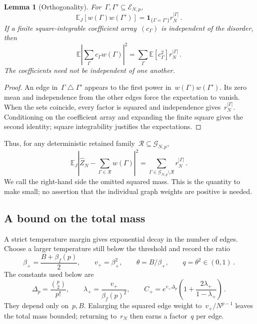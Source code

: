 \documentclass[10pt]{article}
\theoremstyle{plain}
\newtheorem{lemma}[theorem]{Lemma}
\theoremstyle{definition}
\theoremstyle{remark}
\begin{document}
\begin{lemma}[Orthogonality]\label{lem:orthogonality}
For~$\Gamma,\Gamma'\subseteq\mathcal E_{N,p}$,
\begin{equation}\label{eq:orthogonality}
 \mathbb E_J[w(\Gamma)w(\Gamma')]=\mathbf1_{\{\Gamma=\Gamma'\}}r_N^{|\Gamma|}\,.
\end{equation}
If a finite square-integrable coefficient array~$(c_\Gamma)$ is independent of the disorder, then
\begin{equation}\label{eq:random-orthogonality}
 \mathbb E\left|\sum_\Gamma c_\Gamma w(\Gamma)\right|^2
 =\sum_\Gamma\mathbb E[c_\Gamma^2]r_N^{|\Gamma|}\,.
\end{equation}
The coefficients need not be independent of one another.
\end{lemma}
\begin{proof}
An edge in~$\Gamma\mathbin{\triangle}\Gamma'$ appears to the first power in~$w(\Gamma)w(\Gamma')$. Its zero mean and independence from the other edges force the expectation to vanish. When the sets coincide, every factor is squared and independence gives~$r_N^{|\Gamma|}$. Conditioning on the coefficient array and expanding the finite square gives the second identity; square integrability justifies the expectations.
\end{proof}
Thus, for any deterministic retained family~$\mathcal R\subseteq\mathcal G_{N,p}$,
\begin{equation}\label{eq:truncation-isometry}
 \mathbb E_J\left|\hat Z_N-\sum_{\Gamma\in\mathcal R}w(\Gamma)\right|^2
 =\sum_{\Gamma\in\mathcal G_{N,p}\setminus\mathcal R}r_N^{|\Gamma|}\,.
\end{equation}
We call the right-hand side the omitted squared mass. This is the quantity to make small; no assertion that the individual graph weights are positive is needed.

\subsection{A bound on the total mass}
A strict temperature margin gives exponential decay in the number of edges. Choose a larger temperature still below the threshold and record the ratio
\begin{equation}\label{eq:inflation}
 \beta_+=\frac{B+\beta_f(p)}2,\qquad v_+=\beta_+^2,\qquad
 \theta=B/\beta_+,\qquad q=\theta^2\in(0,1)\,.
\end{equation}
The constants used below are
\begin{equation}\label{eq:Cplus}
 \Delta_p=\frac{\binom p2}{p!},\qquad \lambda_+=\frac{v_+}{\beta_f(p)^2},\qquad
 C_+=e^{v_+\Delta_p}\left(1+\frac{2\lambda_+}{1-\lambda_+}\right)\,.
\end{equation}
They depend only on~$p,B$. Enlarging the squared edge weight to~$v_+/N^{p-1}$ leaves the total mass bounded; returning to~$r_N$ then earns a factor~$q$ per edge.
\end{document}
